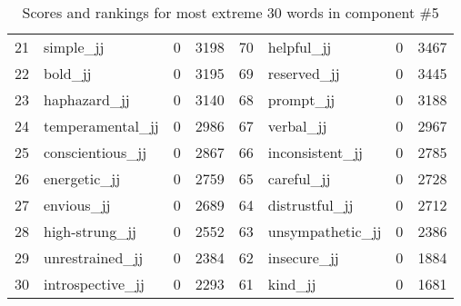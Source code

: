 \begin{table}[tbp]
\begin{tabular}{| rlr@{.}l | rlr@{.}l |}
    21 & simple\_jj & 0 & 3198    &    70 & helpful\_jj & 0 & 3467 \\
    22 & bold\_jj & 0 & 3195    &    69 & reserved\_jj & 0 & 3445 \\
    23 & haphazard\_jj & 0 & 3140    &    68 & prompt\_jj & 0 & 3188 \\
    24 & temperamental\_jj & 0 & 2986    &    67 & verbal\_jj & 0 & 2967 \\
    25 & conscientious\_jj & 0 & 2867    &    66 & inconsistent\_jj & 0 & 2785 \\
    26 & energetic\_jj & 0 & 2759    &    65 & careful\_jj & 0 & 2728 \\
    27 & envious\_jj & 0 & 2689    &    64 & distrustful\_jj & 0 & 2712 \\
    28 & high-strung\_jj & 0 & 2552    &    63 & unsympathetic\_jj & 0 & 2386 \\
    29 & unrestrained\_jj & 0 & 2384    &    62 & insecure\_jj & 0 & 1884 \\
    30 & introspective\_jj & 0 & 2293    &    61 & kind\_jj & 0 & 1681 \\
    \hline
    \end{tabular}
    \caption{Scores and rankings for most extreme 30 words in component \#5} 
\end{table}
\clearpage
